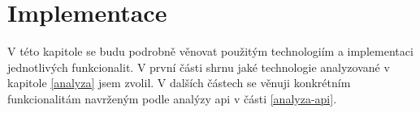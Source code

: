 \chapter{Implementace}\label{implementace}

V této kapitole se budu podrobně věnovat použitým technologiím a implementaci jednotlivých funkcionalit.
V první části shrnu jaké technologie analyzované v kapitole \ref{analyza} jsem zvolil.
V dalších částech se věnuji konkrétním funkcionalitám navrženým podle analýzy \acrshort{api} v části \ref{analyza-api}.


















